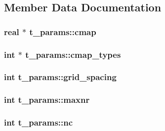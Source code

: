 \subsection{\-Member \-Data \-Documentation}
\hypertarget{structt__params_a11323f589e20158e21e869fc9880f397}{
\subsubsection[{cmap}]{\setlength{\rightskip}{0pt plus 5cm}real $\ast$ {\bf t\-\_\-params\-::cmap}}}\label{structt__params_a11323f589e20158e21e869fc9880f397}
\hypertarget{structt__params_a21de709e673a13dc0069ed2a8adedace}{
\subsubsection[{cmap\-\_\-types}]{\setlength{\rightskip}{0pt plus 5cm}int $\ast$ {\bf t\-\_\-params\-::cmap\-\_\-types}}}\label{structt__params_a21de709e673a13dc0069ed2a8adedace}
\hypertarget{structt__params_aaf4d196f4f14a60807ea0f99575ec172}{
\subsubsection[{grid\-\_\-spacing}]{\setlength{\rightskip}{0pt plus 5cm}int {\bf t\-\_\-params\-::grid\-\_\-spacing}}}\label{structt__params_aaf4d196f4f14a60807ea0f99575ec172}
\hypertarget{structt__params_a57fab6286d45622c20025b8f9f095565}{
\subsubsection[{maxnr}]{\setlength{\rightskip}{0pt plus 5cm}int {\bf t\-\_\-params\-::maxnr}}}\label{structt__params_a57fab6286d45622c20025b8f9f095565}
\hypertarget{structt__params_ad52c681ae342fda91ae2c0b3bcc0a906}{
\subsubsection[{nc}]{\setlength{\rightskip}{0pt plus 5cm}int {\bf t\-\_\-params\-::nc}}}\label{structt__params_ad52c681ae342fda91ae2c0b3bcc0a906}
